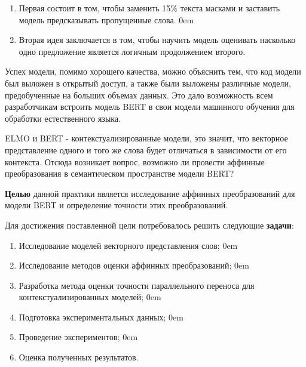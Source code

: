 \documentclass[a4paper,14pt]{article}
\begin{document}
\begin{enumerate}
	\itemsep0em 
	\item Первая состоит в том, чтобы заменить 15\% текста масками и заставить модель предсказывать пропущенные слова.
	\itemsep0em 
	\item Вторая идея заключается в том, чтобы научить модель оценивать насколько одно предложение является логичным продолжением второго.
\end{enumerate}

Успех модели, помимо хорошего качества, можно объяснить тем, что код модели был выложен в открытый доступ, а также были выложены различные модели, предобученные на больших объемах данных.
Это дало возможность всем разработчикам встроить модель BERT в свои модели машинного обучения для обработки естественного языка.

ELMO и BERT - контекстуализированные модели, это значит, что векторное представление одного и того же слова будет отличаться в зависимости от его контекста.
Отсюда возникает вопрос, возможно ли провести аффинные преобразования в семантическом пространстве модели BERT?

\textbf{Целью} данной практики является исследование аффинных преобразований для модели BERT и определение точности этих преобразований.

Для достижения поставленной цели потребовалось решить следующие \textbf{задачи}:

\begin{enumerate}
	\itemsep0em 
	\item Исследование моделей векторного представления слов;
		\itemsep0em 
	\item Исследование методов оценки аффинных преобразований;
		\itemsep0em 
	\item Разработка метода оценки точности параллельного переноса для контекстуализированных моделей;
		\itemsep0em 
	\item Подготовка экспериментальных данных;
		\itemsep0em 
	\item Проведение экспериментов;
		\itemsep0em 
	\item Оценка полученных результатов.

\end{enumerate}
\end{document}

